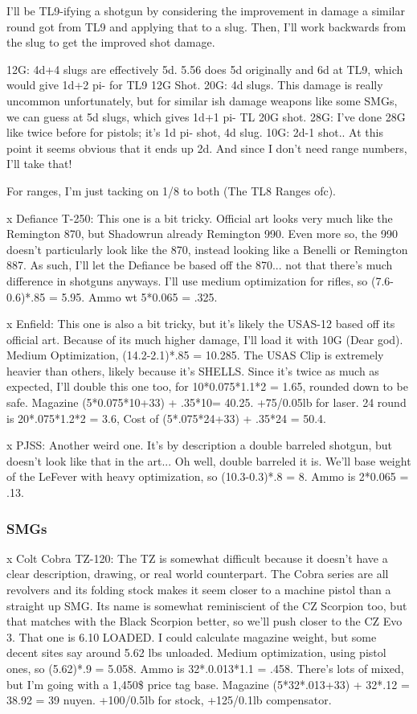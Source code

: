 \begin{multicols*}{2}
	I'll be TL9-ifying a shotgun by considering the improvement in damage a similar round got from TL9 and applying that to a slug. Then, I'll work backwards from the slug to get the improved shot damage. 
	
	12G: 4d+4 slugs are effectively 5d. 5.56 does 5d originally and 6d at TL9, which would give 1d+2 pi- for TL9 12G Shot.
	20G: 4d slugs. This damage is really uncommon unfortunately, but for similar ish damage weapons like some SMGs, we can guess at 5d slugs, which gives 1d+1 pi- TL 20G shot.
	28G: I've done 28G like twice before for pistols; it's 1d pi- shot, 4d slug.
	10G: 2d-1 shot.. At this point it seems obvious that it ends up 2d. And since I don't need range numbers, I'll take that!
	
	For ranges, I'm just tacking on 1/8 to both (The TL8 Ranges ofc).
	
	x Defiance T-250: This one is a bit tricky. Official art looks very much like the Remington 870, but Shadowrun already Remington 990. Even more so, the 990 doesn't particularly look like the 870, instead looking like a Benelli or Remington 887. As such, I'll let the Defiance be based off the 870... not that there's much difference in shotguns anyways. I'll use medium optimization for rifles, so (7.6-0.6)*.85 = 5.95. Ammo wt 5*0.065 = .325.
	
	x Enfield: This one is also a bit tricky, but it's likely the USAS-12 based off its official art. Because of its much higher damage, I'll load it with 10G (Dear god). Medium Optimization, (14.2-2.1)*.85 = 10.285. The USAS Clip is extremely heavier than others, likely because it's SHELLS. Since it's twice as much as expected, I'll double this one too, for 10*0.075*1.1*2 = 1.65, rounded down to be safe. Magazine (5*0.075*10+33) + .35*10= 40.25. +75/0.05lb for laser. 24 round is 20*.075*1.2*2 = 3.6, Cost of (5*.075*24+33) + .35*24 = 50.4.
	
	x PJSS: Another weird one. It's by description a double barreled shotgun, but doesn't look like that in the art... Oh well, double barreled it is. We'll base weight of the LeFever with heavy optimization, so (10.3-0.3)*.8 = 8. Ammo is  2*0.065 = .13.
	
	\subsubsection{SMGs}
	
	x Colt Cobra TZ-120: The TZ is somewhat difficult because it doesn't have a clear description, drawing, or real world counterpart. The Cobra series are all revolvers and its folding stock makes it seem closer to a machine pistol than a straight up SMG. Its name is somewhat reminiscient of the CZ Scorpion too, but that matches with the Black Scorpion better, so we'll push closer to the CZ Evo 3. That one is 6.10 LOADED. I could calculate \GURPS magazine weight, but some decent sites say around 5.62 lbs unloaded. Medium optimization, using pistol ones, so (5.62)*.9 = 5.058. Ammo is 32*.0.013*1.1 = .458. There's lots of mixed, but I'm going with a 1,450\$ price tag base. Magazine (5*32*.013+33) + 32*.12 = 38.92 = 39 nuyen. +100/0.5lb for stock, +125/0.1lb compensator.
	

\end{multicols*}
